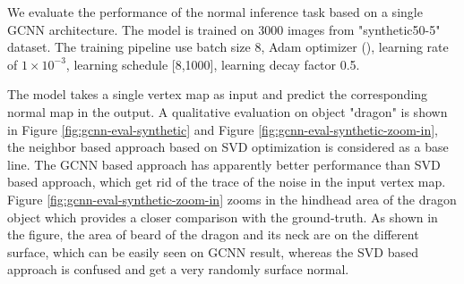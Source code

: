\documentclass[border=15pt, multi, tikz]{article}
\begin{document}
We evaluate the performance of the normal inference task based on a single GCNN architecture. The model is trained on 3000 images from "synthetic50-5" dataset. The training pipeline use batch size $ 8 $,  Adam optimizer (\cite{adam}), learning rate of  $ 1\times10^{-3} $, learning schedule [8,1000], learning decay factor 0.5. 

The model takes a single vertex map as input and predict the corresponding normal map in the output. A qualitative evaluation on object "dragon" is shown in Figure \ref{fig:gcnn-eval-synthetic} and Figure \ref{fig:gcnn-eval-synthetic-zoom-in}, the neighbor based approach based on SVD optimization is considered as a base line. The GCNN based approach has apparently better performance than SVD based approach, which get rid of the trace of the noise in the input vertex map. Figure \ref{fig:gcnn-eval-synthetic-zoom-in} zooms in the hindhead area of the dragon object which provides a closer comparison with the ground-truth.
 As shown in the figure, the area of beard of the dragon and its neck are on the different surface, which can be easily seen on GCNN result, whereas the SVD based approach is confused and get a very randomly surface normal.
\end{document}
